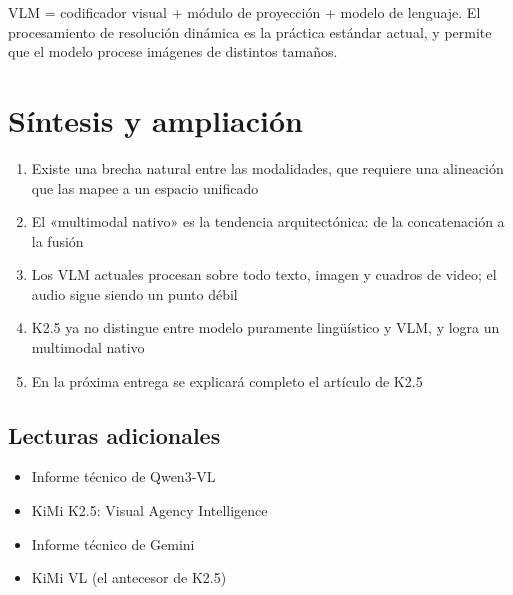 \documentclass[a4paper]{article}
\begin{document}
VLM = codificador visual + módulo de proyección + modelo de lenguaje. El procesamiento de resolución dinámica es la práctica estándar actual, y permite que el modelo procese imágenes de distintos tamaños.

\section{Síntesis y ampliación}

\begin{enumerate}
  \item Existe una brecha natural entre las modalidades, que requiere una alineación que las mapee a un espacio unificado
  \item El «multimodal nativo» es la tendencia arquitectónica: de la concatenación a la fusión
  \item Los VLM actuales procesan sobre todo texto, imagen y cuadros de video; el audio sigue siendo un punto débil
  \item K2.5 ya no distingue entre modelo puramente lingüístico y VLM, y logra un multimodal nativo
  \item En la próxima entrega se explicará completo el artículo de K2.5
\end{enumerate}

\subsection{Lecturas adicionales}
\begin{itemize}
  \item Informe técnico de Qwen3-VL
  \item KiMi K2.5: Visual Agency Intelligence
  \item Informe técnico de Gemini
  \item KiMi VL (el antecesor de K2.5)
\end{itemize}
\end{document}
